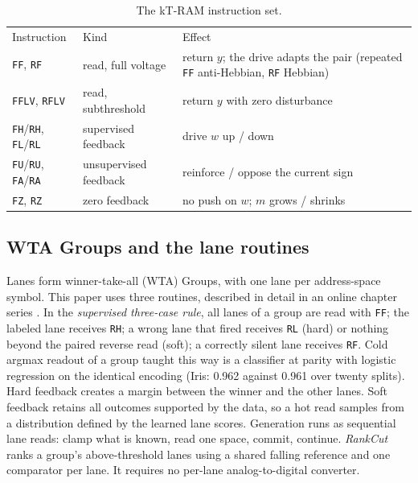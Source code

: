 \documentclass[reprint,amsmath,amssymb,aps,nofootinbib]{revtex4-2}
\begin{document}
\begin{table}
\caption{The kT-RAM instruction set. \label{tab:isa}}
\begin{ruledtabular}
\footnotesize
\begin{tabular}{p{1.75cm}p{2.1cm}p{3.6cm}}
Instruction & Kind & Effect \\
\colrule
\texttt{FF}, \texttt{RF} & read, full voltage & return $y$; the drive
adapts the pair (repeated \texttt{FF} anti-Hebbian, \texttt{RF}
Hebbian) \\
\texttt{FFLV}, \texttt{RFLV} & read, subthreshold & return $y$ with
zero disturbance \\
\texttt{FH}/\texttt{RH}, \texttt{FL}/\texttt{RL} & supervised
feedback & drive $w$ up / down \\
\texttt{FU}/\texttt{RU}, \texttt{FA}/\texttt{RA} & unsupervised
feedback & reinforce / oppose the current sign \\
\texttt{FZ}, \texttt{RZ} & zero feedback & no push on $w$; $m$ grows
/ shrinks \\
\end{tabular}
\end{ruledtabular}
\end{table}

\subsection{WTA Groups and the lane routines}\label{sec:routines}

Lanes form winner-take-all (WTA) Groups, with one lane per address-space
symbol. This paper uses three routines, described in detail in an online
chapter series \cite{knowm2026blog}. In the \emph{supervised three-case rule}, all
lanes of a group are read with \texttt{FF}; the labeled lane receives
\texttt{RH}; a wrong lane that fired receives \texttt{RL} (hard) or
nothing beyond the paired reverse read (soft); a correctly silent lane
receives \texttt{RF}. Cold argmax readout of a group taught this way
is a classifier at parity with logistic regression on the identical
encoding (Iris: 0.962 against 0.961 over twenty splits). Hard feedback creates a margin between the winner and the other lanes.
Soft feedback retains all outcomes supported by the data, so a hot read
samples from a distribution defined by the learned lane scores. Generation runs as sequential lane reads: clamp
what is known, read one space, commit, continue. \emph{RankCut} ranks a group's above-threshold lanes using a shared
falling reference and one comparator per lane. It requires no per-lane
analog-to-digital converter. 
\end{document}

